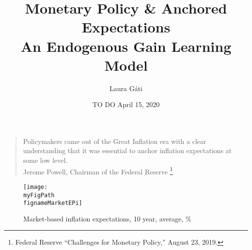 \documentclass[11pt]{beamer}
\author[]{Laura G\'ati}
\institute[]{Boston College}
\title[]{Monetary Policy \& Anchored Expectations \\
An Endogenous Gain Learning Model}
\date[]{TO DO April 15, 2020}
\def \myFigPath {../../../figures/}
\def\myTinyFigScale{0.16}
\def\fignameMarketEPi{epi10_2020_06_04}
\begin{document}
\begin{frame}[plain] %

\maketitle

\end{frame}




\begin{frame}\label{motivation}
	
\begin{quote}
Policymakers came out of the Great Inflation era with a clear understanding that it was essential to anchor inflation expectations at some low level. \\
Jerome Powell, Chairman of the Federal Reserve \footnote{Federal Reserve ``Challenges for Monetary Policy,''  August 23, 2019.}
\end{quote}	

\begin{figure}[h!]
\texttt{[image: \\myFigPath \\fignameMarketEPi]}
\caption{Market-based inflation expectations, 10 year, average, \%}
\label{epi}
\end{figure}



\vspace{-0.5cm}
\hfill \hyperlink{app_TIPS}{}
\end{frame}
\end{document}
